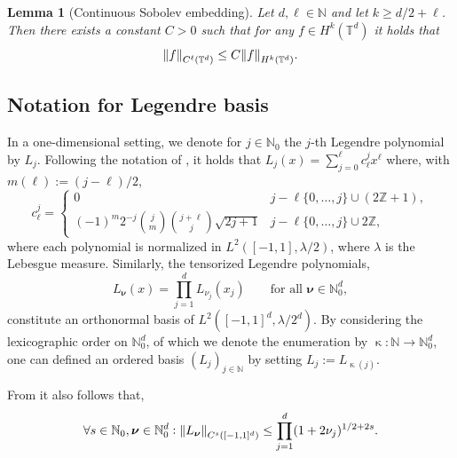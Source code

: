 \documentclass{article}
\numberwithin{equation}{section}
\newcommand{\T}{\mathbb{T}}
\newcommand{\N}{\mathbb{N}}
\newcommand{\Z}{\mathbb{Z}}
\newcommand{\enum}{{\upkappa}}
\newcommand{\1}{\mathbbm{1}}
\newtheorem{lemma}[theorem]{Lemma}
\begin{document}
\begin{lemma}[Continuous Sobolev embedding]\label{lem:sobolev-embedding}
Let $d,\ell\in\N$ and let $k\geq d/2+\ell$. Then there exists a constant $C>0$ such that for any $f\in H^{k}(\T^d)$ it holds that
\begin{equation}
    \norm{f}_{C^\ell(\T^d)}\leq C \norm{f}_{H^k(\T^d)}.
\end{equation}
\end{lemma}



\subsection{Notation for Legendre basis}\label{app:Legendre}
In a one-dimensional setting, we denote for $j\in \N_0$ the $j$-th Legendre polynomial by $L_j$. Following the notation of \cite{opschoor2019exponential}, it holds that $L_j(x) = \sum_{j=0}^\ell c^j_\ell x^\ell$ where, with $m(\ell):=(j-\ell)/2$,
\begin{equation}
    c^j_\ell = \begin{cases}
    0 & j-\ell \{0,\ldots,j\}\cup (2\Z+1),\\
    (-1)^m2^{-j}\binom{j}{m}\binom{j+\ell}{j}\sqrt{2j+1} & j-\ell \{0,\ldots,j\}\cup 2\Z, 
    \end{cases}
\end{equation}
where each polynomial is normalized in $L^2([-1,1], \lambda/2)$, where $\lambda$ is the Lebesgue measure. Similarly, the tensorized Legendre polynomials, 
\begin{equation}
    L_{\bm{\nu}}(x) = \prod_{j=1}^d L_{\nu_j}(x_j)\qquad \text{for all } \bm{\nu}\in \N^d_0, 
\end{equation}
constitute an orthonormal basis of $L^2([-1,1]^d, \lambda/2^d)$. By considering the lexicographic order on $\N_0^d$, of which we denote the enumeration by $\enum:\N\to\N_0^d$, one can defined an ordered basis $(L_j)_{j\in\N}$ by setting $L_j := L_{\enum(j)}$. 

From \cite[eq. (2.19)]{opschoor2019exponential} it also follows that, 
\begin{equation}\label{eq:legendre-cs-bound}
    \forall s\in\N_0, \bm{\nu}\in \N^d_0: \norm{L_{\bm{\nu}}}_{C^s([-1,1]^d)} \leq \prod_{j=1}^d(1+2\nu_j)^{1/2+2s}. 
\end{equation}
\end{document}
